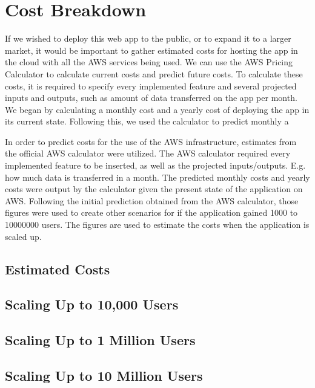 \chapter{Cost Breakdown}\label{ch:cost-breakdown}

If we wished to deploy this web app to the public, or to expand it to a larger market, it would be important to
gather estimated costs for hosting the app in the cloud with all the AWS services being used.
We can use the AWS Pricing Calculator to calculate current costs and predict future costs.
To calculate these costs, it is required to specify every implemented feature and several projected inputs and outputs,
such as amount of data transferred on the app per month.
We began by calculating a monthly cost and a yearly cost of deploying the app in its current state.
Following this, we used the calculator to predict monthly a

In order to predict costs for the use of the AWS infrastructure, estimates from the official AWS
calculator were utilized. The AWS calculator required every implemented feature to be
inserted, as well as the projected inputs/outputs. E.g. how much data is transferred in a month.
The predicted monthly costs and yearly costs were output by the calculator given the present
state of the application on AWS. Following the initial prediction obtained from the AWS
calculator, those figures were used to create other scenarios for if the application gained 1000
to 10000000 users. The figures are used to estimate the costs when the application is scaled
up.


\section{Estimated Costs}\label{sec:estimated-costs}


\section{Scaling Up to 10,000 Users}\label{sec:scaling-up-to-10000-users}


\section{Scaling Up to 1 Million Users}\label{sec:scaling-up-to-1-million-users}


\section{Scaling Up to 10 Million Users}\label{sec:scaling-up-to-10-million-users}
